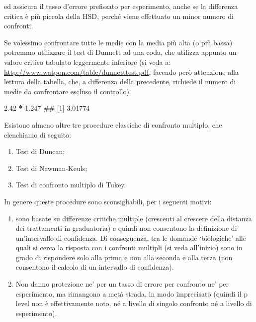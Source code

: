 \documentclass[a4paper,12pt,oneside]{book}
\providecommand{\tightlist}{%
  \setlength{\itemsep}{0pt}\setlength{\parskip}{0pt}}
\newenvironment{Shaded}{\begin{snugshade}}{\end{snugshade}}
\newcommand{\FloatTok}[1]{\textcolor[rgb]{0.00,0.00,0.81}{#1}}
\newcommand{\StringTok}[1]{\textcolor[rgb]{0.31,0.60,0.02}{#1}}
\newcommand{\OperatorTok}[1]{\textcolor[rgb]{0.81,0.36,0.00}{\textbf{#1}}}
\newcommand{\NormalTok}[1]{#1}
\theoremstyle{definition}
\theoremstyle{definition}
\theoremstyle{definition}
\theoremstyle{remark}
\begin{document}
ed assicura il tasso d'errore prefissato per esperimento, anche se la
differenza critica è più piccola della HSD, perché viene effettuato un
minor numero di confronti.

Se volessimo confrontare tutte le medie con la media più alta (o più
bassa) potremmo utilizzare il test di Dunnett ad una coda, che utilizza
appunto un valore critico tabulato leggermente inferiore (si veda a:
\url{http://www.watpon.com/table/dunnetttest.pdf}, facendo però
attenzione alla lettura della tabella, che, a differenza della
precedente, richiede il numero di medie da confrontare escluso il
controllo).

\begin{Shaded}
\begin{Highlighting}[]
\FloatTok{2.42} \OperatorTok{*}\StringTok{ }\FloatTok{1.247}
\NormalTok{## [1] 3.01774}
\end{Highlighting}
\end{Shaded}

Esistono almeno altre tre procedure classiche di confronto multiplo, che
elenchiamo di seguito:

\begin{enumerate}
\def\labelenumi{\arabic{enumi}.}
\tightlist
\item
  Test di Duncan;
\item
  Test di Newman-Keuls;
\item
  Test di confronto multiplo di Tukey.
\end{enumerate}

In genere queste procedure sono sconsigliabili, per i seguenti motivi:

\begin{enumerate}
\def\labelenumi{\arabic{enumi}.}
\tightlist
\item
  sono basate su differenze critiche multiple (crescenti al crescere
  della distanza dei trattamenti in graduatoria) e quindi non consentono
  la definizione di un'intervallo di confidenza. Di conseguenza, tra le
  domande `biologiche' alle quali si cerca la risposta con i confronti
  multipli (si veda all'inizio) sono in grado di rispondere solo alla
  prima e non alla seconda e alla terza (non consentono il calcolo di un
  intervallo di confidenza).
\item
  Non danno protezione ne' per un tasso di errore per confronto ne' per
  esperimento, ma rimangono a metà strada, in modo imprecisato (quindi
  il p level non è effettivamente noto, né a livello di singolo
  confronto né a livello di esperimento).
\end{enumerate}
\end{document}
